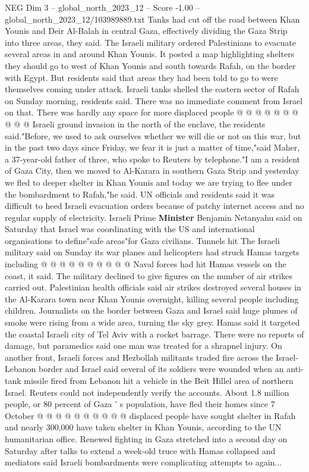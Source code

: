 \begin{textsample}{NEG Dim 3 – global\_north\_2023\_12 – Score -1.00 – global\_north\_2023\_12/103989889.txt}
Tanks had cut off the road between Khan Younis and Deir Al-Balah in central Gaza, effectively dividing the Gaza Strip into three areas, they said.
The Israeli military ordered Palestinians to evacuate several areas in and around Khan Younis.
It posted a map highlighting shelters they should go to west of Khan Younis and south towards Rafah, on the border with Egypt.
But residents said that areas they had been told to go to were themselves coming under attack.
Israeli tanks shelled the eastern sector of Rafah on Sunday morning, residents said.
There was no immediate comment from Israel on that.
There was hardly any space for more displaced people @ @ @ @ @ @ @ @ @ @ Israeli ground invasion in the north of the enclave, the residents said."Before, we used to ask ourselves whether we will die or not on this war, but in the past two days since Friday, we fear it is just a matter of time,"said Maher, a 37-year-old father of three, who spoke to Reuters by telephone."I am a resident of Gaza City, then we moved to Al-Karara in southern Gaza Strip and yesterday we fled to deeper shelter in Khan Younis and today we are trying to flee under the bombardment to Rafah,"he said.
UN officials and residents said it was difficult to heed Israeli evacuation orders because of patchy internet access and no regular supply of electricity.
Israeli Prime \textbf{Minister} Benjamin Netanyahu said on Saturday that Israel was coordinating with the US and international organisations to define"safe areas"for Gaza civilians.
Tunnels hit The Israeli military said on Sunday its war planes and helicopters had struck Hamas targets including @ @ @ @ @ @ @ @ @ @ Naval forces had hit Hamas vessels on the coast, it said.
The military declined to give figures on the number of air strikes carried out.
Palestinian health officials said air strikes destroyed several houses in the Al-Karara town near Khan Younis overnight, killing several people including children.
Journalists on the border between Gaza and Israel said huge plumes of smoke were rising from a wide area, turning the sky grey.
Hamas said it targeted the coastal Israeli city of Tel Aviv with a rocket barrage.
There were no reports of damage, but paramedics said one man was treated for a shrapnel injury.
On another front, Israeli forces and Hezbollah militants traded fire across the Israel-Lebanon border and Israel said several of its soldiers were wounded when an anti-tank missile fired from Lebanon hit a vehicle in the Beit Hillel area of northern Israel.
Reuters could not independently verify the accounts.
About 1.8 million people, or 80 percent of Gaza ' s population, have fled their homes since 7 October @ @ @ @ @ @ @ @ @ @ displaced people have sought shelter in Rafah and nearly 300,000 have taken shelter in Khan Younis, according to the UN humanitarian office.
Renewed fighting in Gaza stretched into a second day on Saturday after talks to extend a week-old truce with Hamas collapsed and mediators said Israeli bombardments were complicating attempts to again...

\end{textsample}
